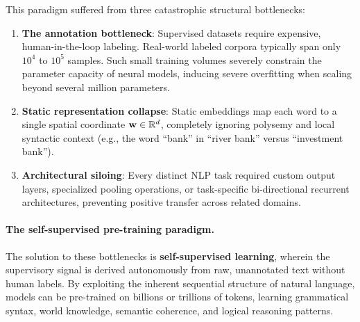 \documentclass[../../main.tex]{subfiles}
\begin{document}
This paradigm suffered from three catastrophic structural bottlenecks:
\begin{enumerate}
    \item \textbf{The annotation bottleneck}: Supervised datasets require expensive, human-in-the-loop labeling. Real-world labeled corpora typically span only $10^4$ to $10^5$ samples. Such small training volumes severely constrain the parameter capacity of neural models, inducing severe overfitting when scaling beyond several million parameters.
    \item \textbf{Static representation collapse}: Static embeddings map each word to a single spatial coordinate $\mathbf{w} \in \mathbb{R}^d$, completely ignoring polysemy and local syntactic context (e.g., the word ``bank'' in ``river bank'' versus ``investment bank'').
    \item \textbf{Architectural siloing}: Every distinct NLP task required custom output layers, specialized pooling operations, or task-specific bi-directional recurrent architectures, preventing positive transfer across related domains.
\end{enumerate}

\paragraph{The self-supervised pre-training paradigm.}
The solution to these bottlenecks is \textbf{self-supervised learning}, wherein the supervisory signal is derived autonomously from raw, unannotated text without human labels. By exploiting the inherent sequential structure of natural language, models can be pre-trained on billions or trillions of tokens, learning grammatical syntax, world knowledge, semantic coherence, and logical reasoning patterns.
\end{document}
